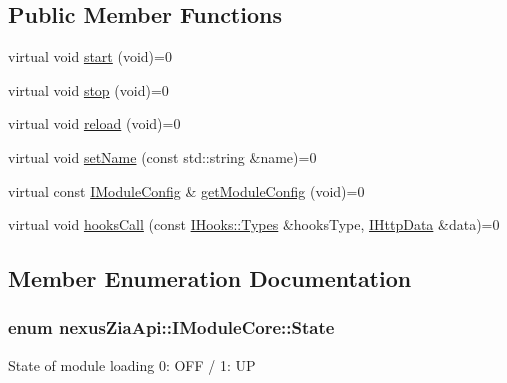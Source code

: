 \subsection*{Public Member Functions}
\begin{DoxyCompactItemize}
\item 
virtual void \hyperlink{classnexusZiaApi_1_1IModuleCore_ae52fea1f96d8954f0b128a66405d4a45}{start} (void)=0
\item 
virtual void \hyperlink{classnexusZiaApi_1_1IModuleCore_ad47e9254ca0dcbe6cfcc5756ab8a1b87}{stop} (void)=0
\item 
virtual void \hyperlink{classnexusZiaApi_1_1IModuleCore_a36b1740f097ba13db39431f1c5f9f8a9}{reload} (void)=0
\item 
virtual void \hyperlink{classnexusZiaApi_1_1IModuleCore_a5770e4c73d8964916d7e429482b52e72}{set\+Name} (const std\+::string \&name)=0
\item 
virtual const \hyperlink{classnexusZiaApi_1_1IModuleConfig}{I\+Module\+Config} \& \hyperlink{classnexusZiaApi_1_1IModuleCore_a953c7450755ba4953251029980084a6c}{get\+Module\+Config} (void)=0
\item 
virtual void \hyperlink{classnexusZiaApi_1_1IModuleCore_a32cce7b43a738e457b1e436c119cd489}{hooks\+Call} (const \hyperlink{classnexusZiaApi_1_1IHooks_ab414a80fd9ed1c967916942ec5c20433}{I\+Hooks\+::\+Types} \&hooks\+Type, \hyperlink{classnexusZiaApi_1_1IHttpData}{I\+Http\+Data} \&data)=0
\end{DoxyCompactItemize}


\subsection{Member Enumeration Documentation}
\subsubsection[{\texorpdfstring{State}{State}}]{\setlength{\rightskip}{0pt plus 5cm}enum {\bf nexus\+Zia\+Api\+::\+I\+Module\+Core\+::\+State}\hspace{0.3cm}{\ttfamily [strong]}}\hypertarget{classnexusZiaApi_1_1IModuleCore_abc0dcb61041187581a512822e934bc25}{}\label{classnexusZiaApi_1_1IModuleCore_abc0dcb61041187581a512822e934bc25}
State of module loading 0\+: O\+FF / 1\+: UP 


